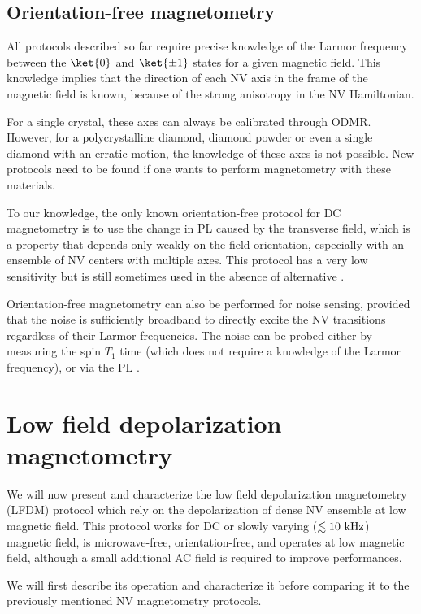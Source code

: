 \documentclass[a4paper, 11pt]{report}
\begin{document}
\subsection{Orientation-free magnetometry}
All protocols described so far require precise knowledge of the Larmor frequency between the $\ket{0}$ and $\ket{\pm 1}$ states for a given magnetic field. This knowledge implies that the direction of each NV axis in the frame of the magnetic field is known, because of the strong anisotropy in the NV Hamiltonian. 

For a single crystal, these axes can always be calibrated through ODMR. However, for a polycrystalline diamond, diamond powder or even a single diamond with an erratic motion, the knowledge of these axes is not possible. New protocols need to be found if one wants to perform magnetometry with these materials.

To our knowledge, the only known orientation-free protocol for DC magnetometry is to use the change in PL caused by the transverse field, which is a property that depends only weakly on the field orientation, especially with an ensemble of NV centers with multiple axes. This protocol has a very low sensitivity but is still sometimes used in the absence of alternative \citep{rondin2012nanoscale, tetienne2012magnetic, maletinsky2012robust, chapman2013background, jones2020selective, zhu2022sunlight}.

Orientation-free magnetometry can also be performed for noise sensing, provided that the noise is sufficiently broadband to directly excite the NV transitions regardless of their Larmor frequencies. The noise can be probed either by measuring the spin $T_1$ time \citep{kolkowitz2015probing, andersen2019electron} (which does not require a knowledge of the Larmor frequency), or via the PL \citep{finco2021imaging}.

\section{Low field depolarization magnetometry}
\label{sec LFDM}
We will now present and characterize the low field depolarization magnetometry (LFDM) protocol which rely on the depolarization of dense NV ensemble at low magnetic field. This protocol works for DC or slowly varying ($\lesssim 10\ \rm kHz$) magnetic field, is microwave-free, orientation-free, and operates at low magnetic field, although a small additional AC field is required to improve performances.

We will first describe its operation and characterize it before comparing it to the previously mentioned NV magnetometry protocols.
\end{document}
